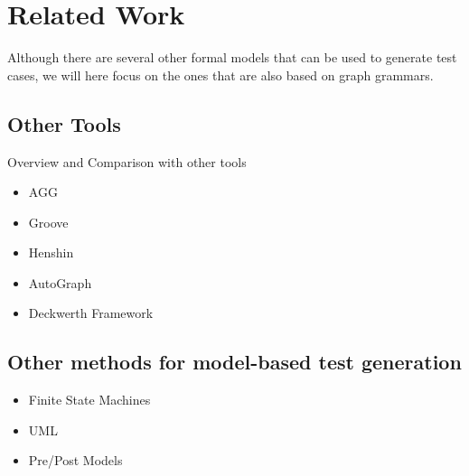 \chapter{Related Work}\label{ch:related-work}

Although there are several other formal models that can be used to generate test cases, we will here focus on the ones that are also based on graph grammars.

\section{Other Tools}

Overview and Comparison with other tools

\begin{itemize}
\item AGG
\item Groove
\item Henshin
\item AutoGraph
\item Deckwerth Framework
\end{itemize}

\section{Other methods for model-based test generation}

\begin{itemize}
  \item Finite State Machines
  \item UML
  \item Pre/Post Models
\end{itemize}

\cite{Baldan2004}

\cite{Runge2013}
